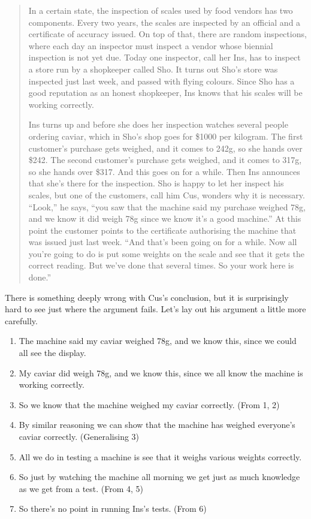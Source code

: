 \begin{quote}
In a certain state, the inspection of scales used by food vendors has two components. Every two years, the scales are inspected by an official and a certificate of accuracy issued. On top of that, there are random inspections, where each day an inspector must inspect a vendor whose biennial inspection is not yet due. Today one inspector, call her Ins, has to inspect a store run by a shopkeeper called Sho. It turns out Sho's store was inspected just last week, and passed with flying colours. Since Sho has a good reputation as an honest shopkeeper, Ins knows that his scales will be working correctly.

Ins turns up and before she does her inspection watches several people ordering caviar, which in Sho's shop goes for \$1000 per kilogram. The first customer's purchase gets weighed, and it comes to 242g, so she hands over \$242. The second customer's purchase gets weighed, and it comes to 317g, so she hands over \$317. And this goes on for a while. Then Ins announces that she's there for the inspection. Sho is happy to let her inspect his scales, but one of the customers, call him Cus, wonders why it is necessary. ``Look,'' he says, ``you saw that the machine said my purchase weighed 78g, and we know it did weigh 78g since we know it's a good machine.'' At this point the customer points to the certificate authorising the machine that was issued just last week. ``And that's been going on for a while. Now all you're going to do is put some weights on the scale and see that it gets the correct reading. But we've done that several times. So your work here is done.''
\end{quote}

\noindent There is something deeply wrong with Cus's conclusion, but it is surprisingly hard to see just where the argument fails. Let's lay out his argument a little more carefully.

\begin{enumerate}
\item The machine said my caviar weighed 78g, and we know this, since we could all see the display.
\item My caviar did weigh 78g, and we know this, since we all know the machine is working correctly.
\item So we know that the machine weighed my caviar correctly. (From 1, 2)
\item By similar reasoning we can show that the machine has weighed everyone's caviar correctly. (Generalising 3)
\item All we do in testing a machine is see that it weighs various weights correctly.
\item So just by watching the machine all morning we get just as much knowledge as we get from a test. (From 4, 5)
\item So there's no point in running Ins's tests. (From 6)
\end{enumerate}


